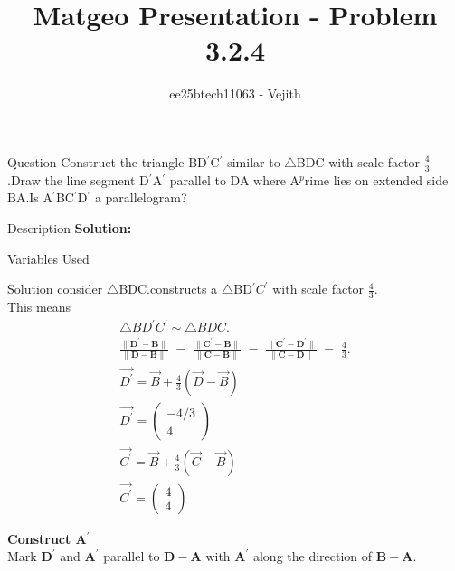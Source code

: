 \documentclass{beamer}
\title{Matgeo Presentation - Problem 3.2.4}
\author{ee25btech11063 - Vejith}
\numberwithin{equation}{section}
\theoremstyle{remark}
\providecommand{\norm}[1]{\lVert#1\rVert}
\newcommand{\myvec}[1]{\ensuremath{\begin{pmatrix}#1\end{pmatrix}}}
\let\vec\mathbf
\begin{document}
\frame{\titlepage}
\begin{frame}{Question}
Construct the triangle BD$^{\prime}$C$^{\prime}$ similar to $\triangle$BDC with scale factor $\frac{4}{3}$.Draw the line segment D$^{\prime}$A$^{\prime}$ parallel to DA where A$^p$rime lies on extended side BA.Is A$^{\prime}$BC$^{\prime}$D$^{\prime}$ a parallelogram?
\end{frame}

\begin{frame}{Description}
\textbf{Solution: }\\
\begin{table}[h!]    
  \centering
  
  \caption{Variables Used}
  \label{}
\end{table}
\end{frame}

\begin{frame}{Solution}
consider $\triangle$BDC.constructs a $\triangle$BD$^{\prime}C^{\prime}$
 with scale factor $\frac{4}{3}$.\\
This means 
\begin{align}
  \triangle BD^{\prime}C^{\prime} \sim \triangle BDC.\\
\frac{\norm{\vec{D^{\prime}}-\vec{B}}}{\norm{\vec{D}-\vec{B}}} \;=\; \frac{\norm{\vec{C^{\prime}}-\vec{B}}}{\norm{\vec{C}-\vec{B}}} \;=\; \frac{\norm{\vec{C^{\prime}}-\vec{D^{\prime}}}}{\norm{\vec{C}-\vec{D}}} \;=\; \frac{4}{3}.\\
\Vec{D^{\prime}}=\Vec{B}+\frac{4}{3}(\Vec{D}-\Vec{B})\\
\Vec{D^{\prime}}=\myvec{-4/3\\4}\\
\Vec{C^{\prime}}=\Vec{B}+\frac{4}{3}(\Vec{C}-\Vec{B})\\
\Vec{C^{\prime}}=\myvec{4\\4}
\end{align}

\textbf{Construct A$^{\prime}$}\\
Mark $\vec{D^{\prime}}$ and $\vec{A^{\prime}}$ parallel to $\vec{D}-\vec{A}$ with $\vec{A^{\prime}}$ along the direction of  $\vec{B}-\vec{A}$.\\
\end{frame}
\end{document}
